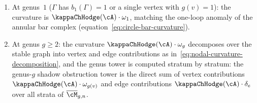 \begin{proposition}
\begin{enumerate}[label=\textup{(\alph*)}]
\item At genus~$1$
 \textup{(}$\Gamma$ has $b_1(\Gamma)=1$ or a single vertex
 with $g(v)=1$\textup{)}: the curvature is
 $\kappaChHodge(\cA)\cdot\omega_1$, matching the one-loop anomaly
 of the annular bar complex
 \textup{(}equation~\eqref{eq:circle-bar-curvature}\textup{)}.

\item At genus $g\ge 2$: the curvature
 $\kappaChHodge(\cA)\cdot\omega_g$ decomposes over the stable graph
 into vertex and edge contributions as
 in~\eqref{eq:nodal-curvature-decomposition}, and the genus
 tower is computed stratum by stratum: the genus-$g$ shadow
 obstruction tower is the direct sum of vertex contributions
 $\kappaChHodge(\cA)\cdot\omega_{g(v)}$ and edge contributions
 $\kappaChHodge(\cA)\cdot\delta_e$ over all strata of
 $\overline{\cM}_{g,n}$.
\end{enumerate}
\end{proposition}

